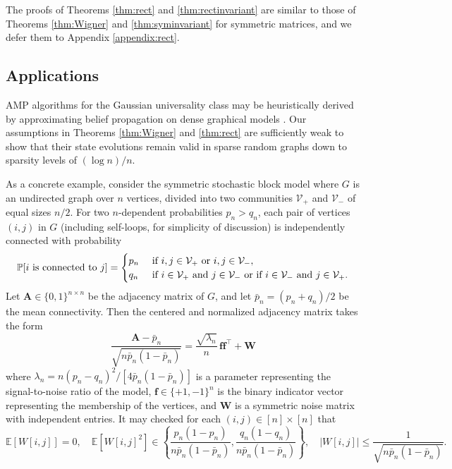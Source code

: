 \documentclass[10pt,reqno]{amsart}
\def\f{\mathbf{f}}
\def\W{\mathbf{W}}
\def\A{\mathbf{A}}
\def\E{\mathbb{E}}
\def\cV{\mathcal{V}}
\begin{document}
The proofs of Theorems \ref{thm:rect} and \ref{thm:rectinvariant} are similar
to those of Theorems \ref{thm:Wigner} and \ref{thm:syminvariant} for 
symmetric matrices, and we defer them to Appendix \ref{appendix:rect}.

\subsection{Applications}\label{subsec:examples}

\begin{example}\label{ex:SBM}
AMP algorithms for the Gaussian universality class
may be heuristically derived by approximating belief
propagation on dense graphical models
\cite{kabashima2003cdma,donoho2010messagea}. Our assumptions in Theorems
\ref{thm:Wigner} and \ref{thm:rect} are
sufficiently weak to show that their state evolutions remain
valid in sparse random graphs down to sparsity levels of $(\log n)/n$.

As a concrete example, consider the symmetric stochastic block model where $G$
is an undirected graph over $n$ vertices, divided into two communities $\cV_+$ and $\cV_-$ of equal sizes $n/2$. For two $n$-dependent probabilities $p_n>q_n$,
each pair of vertices $(i,j)$ in $G$ (including self-loops, for simplicity of
discussion) is independently connected with probability
\[\PP[i \text{ is connected to } j]=\begin{cases} p_n & \text{ if } i,j \in
\cV_+ \text{ or } i,j \in \cV_-, \\
q_n & \text{ if } i \in \cV_+ \text{ and } j \in \cV_- \text{ or if } i \in
\cV_- \text{ and } j \in \cV_+. \end{cases}\]
Let $\A \in \{0,1\}^{n \times n}$ be the adjacency matrix of $G$, and let
$\bar{p}_n=(p_n+q_n)/2$ be the mean connectivity. Then the centered and
normalized adjacency matrix takes the form
\begin{equation}\label{eq:SBM}
\frac{\A-\bar{p}_n}{\sqrt{n\bar{p}_n(1-\bar{p}_n)}}
=\frac{\sqrt{\lambda_n}}{n}\,\f\f^\top+\W
\end{equation}
where $\lambda_n=n(p_n-q_n)^2/[4\bar{p}_n(1-\bar{p}_n)]$
is a parameter representing the signal-to-noise ratio of the model,
$\f \in \{+1,-1\}^n$ is the binary indicator vector representing the membership
of the vertices, and $\W$ is a symmetric noise matrix with independent
entries. It may checked for each $(i,j) \in [n] \times [n]$ that
\[\E[W[i,j]]=0, \quad \E[W[i,j]^2] \in
\left\{\frac{p_n(1-p_n)}{n\bar{p}_n(1-\bar{p}_n)},
\frac{q_n(1-q_n)}{n\bar{p}_n(1-\bar{p}_n)}\right\},
\quad |W[i,j]| \leq \frac{1}{\sqrt{n\bar{p}_n(1-\bar{p}_n)}}.\]


\end{example}
\end{document}
